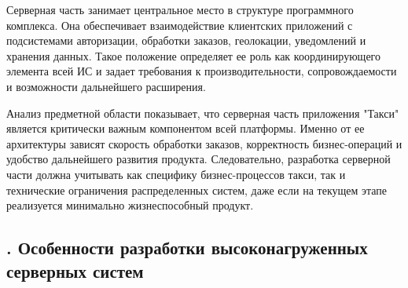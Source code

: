 {	\par \redline Серверная часть занимает центральное место в структуре программного комплекса. Она обеспечивает взаимодействие клиентских приложений с подсистемами авторизации, обработки заказов, геолокации, уведомлений и хранения данных. Такое положение определяет ее роль как координирующего элемента всей ИС и задает требования к производительности, сопровождаемости и возможности дальнейшего расширения.
	
	\par \redline Анализ предметной области показывает, что серверная часть приложения "Такси"{} является критически важным компонентом всей платформы. Именно от ее архитектуры зависят скорость обработки заказов, корректность бизнес-операций и удобство дальнейшего развития продукта. Следовательно, разработка серверной части должна учитывать как специфику бизнес-процессов такси, так и технические ограничения распределенных систем, даже если на текущем этапе реализуется минимально жизнеспособный продукт.
	
	\par
}

\subtitlespace

\subsection*{
	\gostTitleFont
	\redline
	\thechaptercntr .\thesubchaptercntr \spc
	Особенности разработки высоконагруженных серверных систем
} \addtocounter{subchaptercntr}{1}

\subtitlespace

